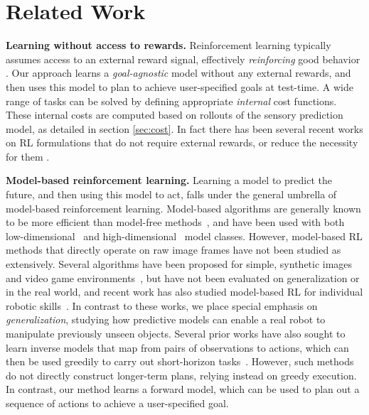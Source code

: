\section{Related Work}\label{sec:rel_work}

\textbf{Learning without access to rewards.}
Reinforcement learning typically assumes access to an external reward signal, effectively \emph{reinforcing} good behavior \cite{lillicrap2015continuous, sutton1998reinforcement}. Our approach learns a \emph{goal-agnostic} model without any external rewards, and then uses this model to plan to achieve user-specified goals at test-time.
A wide range of tasks can be solved by defining appropriate \emph{internal} cost functions. These internal costs are computed based on rollouts of the sensory prediction model, as detailed in section \ref{sec:cost}. In fact there has been several recent works on RL formulations that do not require external rewards\cite{chentanez2005intrinsically, pathak2017curiosity}, or reduce the necessity for them \cite{andrychowicz2017hindsight}.

\noindent \textbf{Model-based reinforcement learning.} Learning a model to predict the future, and then using this model to act, falls under the general umbrella of model-based reinforcement learning. Model-based algorithms are generally known to be more efficient than model-free methods~\cite{chua2018deep, deisenroth2013survey}, and have been used with both low-dimensional~\cite{deisenroth2011pilco} and high-dimensional~\cite{nagabandi2017neural} model classes. However, model-based RL methods that directly operate on raw image frames have not been studied as extensively. Several algorithms have been proposed for simple, synthetic images~\cite{watter2015embed} and video game environments~\cite{alexey, ha2018world, atarioh}, but have not been evaluated on generalization or in the real world, and recent work has also studied model-based RL for individual robotic skills~\cite{zhang2018solar}. In contrast to these works, we place special emphasis on \emph{generalization}, studying how predictive models can enable a real robot to manipulate previously unseen objects.
Several prior works have also sought to learn inverse models that map from pairs of observations to actions, which can then be used greedily to carry out short-horizon tasks~\cite{agrawal2016learning,nair2017combining, ropes}. However, such methods do not directly construct longer-term plans, relying instead on greedy execution. In contrast, our method learns a forward model, which can be used to plan out a sequence of actions to achieve a user-specified goal.

